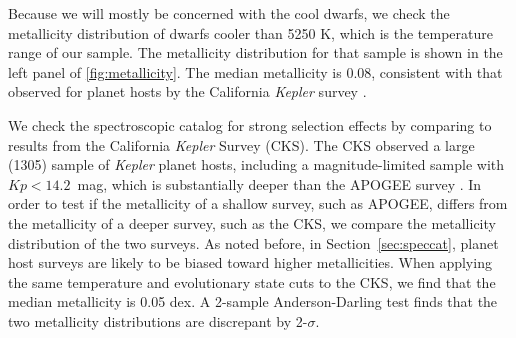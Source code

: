 \documentclass[twocolumn]{aastex6}
\newcommand{\Kepler}{\mbox{\textit{Kepler}}}
\newcommand{\Teff}{\ensuremath{T_{\textrm{eff}}}}
\newcommand{\MK}{\ensuremath{M_{Ks}}}
\newcommand{\feh}{\textrm{[Fe/H]}}
\begin{document}
\begin{figure*}[htb]
    \centering
    \caption{\emph{Left:} Metallicity distribution of the \Kepler{} cool 
        dwarfs in the APOGEE sample, selected as having 
        \(\Teff < 5250 \textrm{ K }\) and a luminosity less than 1.3 mag above 
        the single-star sequence. The 
        thick black line denotes the median metallicity while the thin black 
        lines denote the 1-\(\sigma\) confidence intervals. The hatched region
        to the left of \feh{}=-0.5 denotes the metallicity beneath which the 
        empirical correction in \cref{fig:met_trend} is poorly constrained due 
        to too few metal-poor stars. \emph{Right:} The vertical displacement 
        caused by assuming a single metallicity isochrone.  The blue line 
        represents the difference between the derived \MK{} assuming the 
        median field metallicity and that for the true metallicity. The 
        orange line includes our empirical shape correction for metallicity, 
        which removes most of the predicted width. The hatched region
        to the left of \feh{}=-0.5 denotes the metallicity beneath which the 
        empirical correction is poorly constrained due to too few metal-poor 
        stars.}\label{fig:metallicity}
\end{figure*}

Because we will mostly be concerned with the cool dwarfs, we check the
metallicity distribution of dwarfs cooler than 5250 K, which is the 
temperature range of our sample. The metallicity distribution for that
sample is shown in the left panel of \cref{fig:metallicity}. The median 
metallicity is 0.08, consistent with that observed for planet hosts by 
the California \Kepler{} survey \citep{Petigura17}.  

We check the spectroscopic catalog for strong selection effects by comparing to
results from the California \Kepler{} Survey (CKS). The CKS observed a large
(1305) sample of \Kepler{} planet hosts, including a magnitude-limited sample
with \(Kp < 14.2\)~mag, which is substantially deeper than the APOGEE survey
\citep{Petigura17}. In order to test if the metallicity of a shallow survey, 
such as APOGEE, differs from the metallicity of a deeper survey, such as the 
CKS, we compare the metallicity distribution of the two surveys. As noted before, 
in Section~\ref{sec:speccat}, planet host surveys are likely to be biased toward 
higher metallicities. When applying the same temperature and evolutionary state
cuts to the CKS, we find that the median metallicity is 0.05 dex. A 2-sample
Anderson-Darling test finds that the two metallicity distributions are
discrepant by 2-\(\sigma\).
\end{document}
